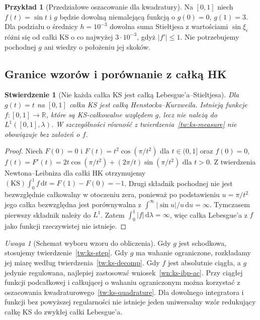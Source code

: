 \documentclass[11pt,a4paper]{article}
\numberwithin{equation}{section}
\theoremstyle{plain}
\newtheorem{stwierdzenie}[twierdzenie]{Stwierdzenie}
\theoremstyle{definition}
\newtheorem{przyklad}[twierdzenie]{Przykład}
\theoremstyle{remark}
\newtheorem{uwaga}[twierdzenie]{Uwaga}
\newcommand{\R}{\mathbb R}
\newcommand{\KS}{\mathrm{KS}}
\begin{document}
\begin{przyklad}[Przedziałowe oszacowanie dla kwadratury]
Na $[0,1]$ niech $f(t)=\sin t$ i $g$ będzie dowolną niemalejącą funkcją o $g(0)=0$, $g(1)=3$. Dla podziału o średnicy $h=10^{-3}$ dowolna suma Stieltjesa z wartościami $\sin\xi_i$ różni się od całki KS o co najwyżej $3\cdot10^{-3}$, gdyż $|f'|\le1$. Nie potrzebujemy pochodnej $g$ ani wiedzy o położeniu jej skoków.
\end{przyklad}

\subsection*{Granice wzorów i porównanie z całką HK}
\begin{stwierdzenie}[Nie każda całka KS jest całką Lebesgue'a--Stieltjesa]
Dla $g(t)=t$ na $[0,1]$ całka KS jest całką Henstocka--Kurzweila. Istnieją funkcje $f:[0,1]\to\R$, które są KS-całkowalne względem $g$, lecz nie należą do $L^1([0,1],\lambda)$. W szczególności równość z twierdzenia~\ref{tw:ks-measure} nie obowiązuje bez założeń o $f$.
\end{stwierdzenie}
\begin{proof}
Niech $F(0)=0$ i $F(t)=t^2\cos(\pi/t^2)$ dla $t\in(0,1]$ oraz $f(0)=0$, $f(t)=F'(t)=2t\cos(\pi/t^2)+(2\pi/t)\sin(\pi/t^2)$ dla $t>0$. Z twierdzenia Newtona--Leibniza dla całki HK otrzymujemy $(\KS)\int_0^1 f\,\mathrm dt=F(1)-F(0)=-1$. Drugi składnik pochodnej nie jest bezwzględnie całkowalny w otoczeniu zera, ponieważ po podstawieniu $u=\pi/t^2$ jego całka bezwzględna jest porównywalna z $\int^\infty|\sin u|/u\,\mathrm du=\infty$. Tymczasem pierwszy składnik należy do $L^1$. Zatem $\int_0^1|f|\,\mathrm d\lambda=\infty$, więc całka Lebesgue'a z $f$ jako funkcji rzeczywistej nie istnieje.
\end{proof}

\begin{uwaga}[Schemat wyboru wzoru do obliczenia]
Gdy $g$ jest schodkowa, stosujemy twierdzenie~\ref{tw:ks-step}. Gdy $g$ ma wahanie ograniczone, rozkładamy jej miarę według twierdzenia~\ref{tw:ks-decomp}. Gdy $f$ jest absolutnie ciągła, a $g$ jedynie regulowana, najlepiej zastosować wniosek~\ref{wn:ks-ibp-ac}. Przy ciągłej funkcji podcałkowej i całkującej o wahaniu ograniczonym można korzystać z oszacowania kwadraturowego~\ref{tw:ks-quadrature}. Dla dowolnego integratora i funkcji bez powyższej regularności nie istnieje jeden uniwersalny wzór redukujący całkę KS do zwykłej całki Lebesgue'a.
\end{uwaga}
\end{document}
